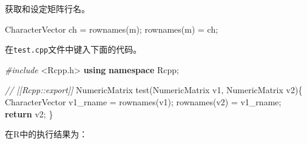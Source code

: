 \documentclass[]{ctexbook}
\newenvironment{Shaded}{\begin{snugshade}}{\end{snugshade}}
\newcommand{\KeywordTok}[1]{\textcolor[rgb]{0.13,0.29,0.53}{\textbf{#1}}}
\newcommand{\ImportTok}[1]{#1}
\newcommand{\CommentTok}[1]{\textcolor[rgb]{0.56,0.35,0.01}{\textit{#1}}}
\newcommand{\ControlFlowTok}[1]{\textcolor[rgb]{0.13,0.29,0.53}{\textbf{#1}}}
\newcommand{\PreprocessorTok}[1]{\textcolor[rgb]{0.56,0.35,0.01}{\textit{#1}}}
\newcommand{\NormalTok}[1]{#1}
\begin{document}
获取和设定矩阵行名。

\begin{Shaded}
\begin{Highlighting}[]
\NormalTok{CharacterVector ch = rownames(m);}
\NormalTok{rownames(m) = ch;}
\end{Highlighting}
\end{Shaded}

在\texttt{test.cpp}文件中键入下面的代码。

\begin{Shaded}
\begin{Highlighting}[]
\PreprocessorTok{#include }\ImportTok{<Rcpp.h>}
\KeywordTok{using} \KeywordTok{namespace}\NormalTok{ Rcpp;}

\CommentTok{// [[Rcpp::export]]}
\NormalTok{NumericMatrix test(NumericMatrix v1, NumericMatrix v2)\{}
\NormalTok{  CharacterVector v1_rname = rownames(v1);}
\NormalTok{  rownames(v2) = v1_rname;}
  \ControlFlowTok{return}\NormalTok{ v2;}
\NormalTok{\}}
\end{Highlighting}
\end{Shaded}

在R中的执行结果为：
\end{document}
